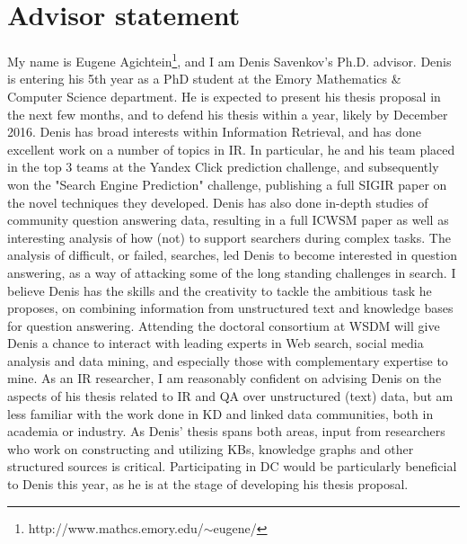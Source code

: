 \documentclass{sig-alternate}
\begin{document}
\section{Advisor statement}
My name is Eugene Agichtein\footnote{http://www.mathcs.emory.edu/$\sim$eugene/}, and I am Denis Savenkov's Ph.D. advisor.
Denis is entering his 5th year as a PhD student at the Emory Mathematics \& Computer Science department. He is expected to present his thesis proposal in the next few months, and to defend his thesis within a year, likely by December 2016.
Denis has broad interests within Information Retrieval, and has done excellent work on a number of topics in IR.
In particular, he and his team placed in the top 3 teams at the Yandex Click prediction challenge, and subsequently won the "Search Engine Prediction" challenge, publishing a full SIGIR paper on the novel techniques they developed.
Denis has also done in-depth studies of community question answering data, resulting in a full ICWSM paper as well as interesting analysis of how (not) to support searchers during complex tasks.
The analysis of difficult, or failed, searches, led Denis to become interested in question answering, as a way of attacking some of the long standing challenges in search.
I believe Denis has the skills and the creativity to tackle the ambitious task he proposes, on combining information from unstructured text and knowledge bases for question answering.
Attending the doctoral consortium at WSDM will give Denis a chance to interact with leading experts in Web search, social media analysis and data mining, and especially those with complementary expertise to mine.
As an IR researcher, I am reasonably confident on advising Denis on the aspects of his thesis related to IR and QA over unstructured (text) data, but am less familiar with the work done in KD and linked data communities, both in academia or industry.
As Denis' thesis spans both areas, input from researchers who work on constructing and utilizing KBs, knowledge graphs and other structured sources is critical.
Participating in DC would be particularly beneficial to Denis this year, as he is at the stage of developing his thesis proposal.
\end{document}

